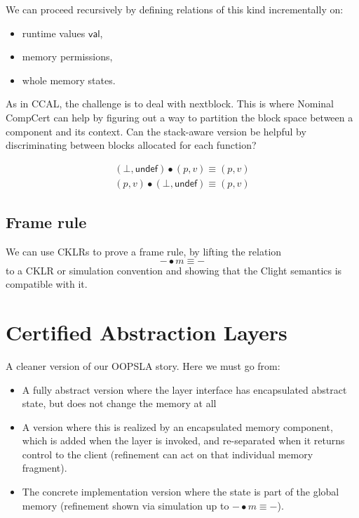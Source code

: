 \documentclass[acmsmall,screen,review,anonymous]{acmart}
\newcommand{\kw}[1]{\ensuremath{ \mathsf{#1} }}
\begin{document}
We can proceed recursively by defining
relations of this kind incrementally on:
\begin{itemize}
  \item runtime values $\mathsf{val}$,
  \item memory permissions,
  \item whole memory states.
\end{itemize}

As in CCAL,
the challenge is to deal with nextblock.
This is where Nominal CompCert can help
by figuring out a way to partition the block space
between a component and its context.
Can the stack-aware version be helpful
by discriminating between blocks allocated
for each function?


\begin{figure}
  \fbox{$\kw{option}\ \kw{perm} \times \kw{memval}$}
  \begin{gather*}
    (\bot, \kw{undef}) \bullet (p, v) \equiv (p, v) \\
    (p, v) \bullet (\bot, \kw{undef}) \equiv (p, v)
  \end{gather*}
\end{figure}

\subsection{Frame rule} %

We can use CKLRs to prove a frame rule,
by lifting the relation
\[
    {-} \bullet m \equiv {-}
\]
to a CKLR or simulation convention
and showing that the Clight semantics
is compatible with it.



\section{Certified Abstraction Layers} %

A cleaner version of our OOPSLA story.
Here we must go from:
\begin{itemize}
  \item A fully abstract version where the layer interface
    has encapsulated abstract state,
    but does not change the memory at all
  \item A version where this is realized by an encapsulated
    memory component,
    which is added when the layer is invoked,
    and re-separated when it returns control to the client
    (refinement can act on that individual memory fragment).
  \item The concrete implementation version
    where the state is part of the global memory
    (refinement shown via
    simulation up to ${-} \bullet m \equiv {-}$).
\end{itemize}
\end{document}
